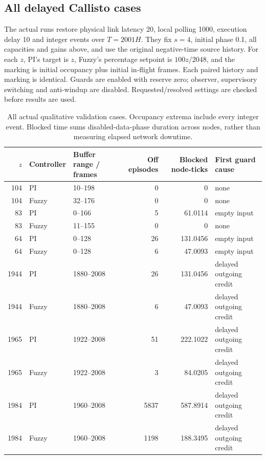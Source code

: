 \subsection{All delayed Callisto cases}
The actual runs restore physical link latency 20, local polling
1000, execution delay 10 and integer events over $T=2001H$.
They fix $s=4$, initial phase 0.1, all capacities and gains above,
and use the original negative-time source history. For each $z$,
PI's target is $z$, Fuzzy's percentage setpoint is $100z/2048$,
and the marking is initial occupancy plus initial in-flight frames.
Each paired history and marking is identical. Guards are enabled
with reserve zero; observer, supervisory switching and anti-windup
are disabled. Requested/resolved settings are checked before
results are used.

\begin{table}[t]
 \caption{All actual qualitative validation cases. Occupancy extrema
 include every integer event. Blocked time sums disabled-data-phase
 duration across nodes, rather than measuring elapsed network downtime.}
 \label{tab:safety_actual_all}
 \centering
 \begin{tabular}{@{}rllrrl@{}}\toprule
 $z$ & Controller & Buffer range / frames & Off episodes & Blocked node-ticks & First guard cause\\\midrule
 104 & PI & 10--198 & 0 & 0 & none\\
 104 & Fuzzy & 32--176 & 0 & 0 & none\\
 83 & PI & 0--166 & 5 & 61.0114 & empty input\\
 83 & Fuzzy & 11--155 & 0 & 0 & none\\
 64 & PI & 0--128 & 26 & 131.0456 & empty input\\
 64 & Fuzzy & 0--128 & 6 & 47.0093 & empty input\\
 1944 & PI & 1880--2008 & 26 & 131.0456 & delayed outgoing credit\\
 1944 & Fuzzy & 1880--2008 & 6 & 47.0093 & delayed outgoing credit\\
 1965 & PI & 1922--2008 & 51 & 222.1022 & delayed outgoing credit\\
 1965 & Fuzzy & 1922--2008 & 3 & 84.0205 & delayed outgoing credit\\
 1984 & PI & 1960--2008 & 5837 & 587.8914 & delayed outgoing credit\\
 1984 & Fuzzy & 1960--2008 & 1198 & 188.3495 & delayed outgoing credit\\\bottomrule
 \end{tabular}
\end{table}

